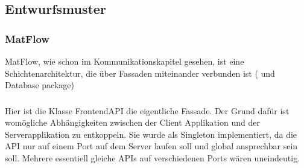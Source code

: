 \subsection{Entwurfsmuster}

\subsubsection{MatFlow}
MatFlow, wie schon im Kommunikationskapitel gesehen, ist eine Schichtenarchitektur, die über Fassaden miteinander verbunden ist
( und Database package)

\subsubsection{}
Hier ist die Klasse FrontendAPI die eigentliche Fassade. Der Grund dafür ist womögliche Abhängigkeiten zwischen
der Client Applikation und der Serverapplikation zu entkoppeln. Sie wurde als Singleton implementiert, da die API
nur auf einem Port auf dem Server laufen soll und global ansprechbar sein soll. Mehrere essentiell gleiche APIs auf
verschiedenen Ports wären uneindeutig.


\newpage
